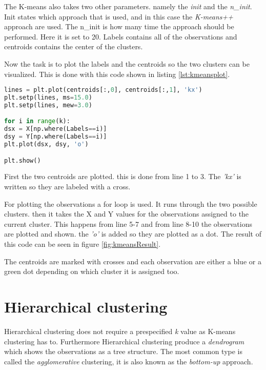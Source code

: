 The K-means also takes two other parameters. namely the \emph{init} and the \emph{n\_init}. Init states which approach that is used, and in this case the \emph{K-means++} approach are used. The n\_init is how many time the approach should be performed. Here it is set to 20.
Labels contains all of the observations and centroids contains the center of the clusters.

Now the task is to plot the labels and the centroids so the two clusters can be visualized. 
This is done with this code shown in listing \ref{lst:kmeansplot}.

\begin{lstlisting}[language=Python, label=lst:kmeansplot, caption=The code for plotting the two clusters]
lines = plt.plot(centroids[:,0], centroids[:,1], 'kx')
plt.setp(lines, ms=15.0)
plt.setp(lines, mew=3.0)

for i in range(k):
dsx = X[np.where(Labels==i)]
dsy = Y[np.where(Labels==i)]
plt.plot(dsx, dsy, 'o')

plt.show()
\end{lstlisting}

First the two centroids are plotted. this is done from line 1 to 3. The \emph{'kx'} is written so they are labeled with a cross.

For plotting the observations a for loop is used. It runs through the two possible clusters. then it takes the X and Y values for the observations assigned to the current cluster. This happens from line 5-7 and from line 8-10 the observations are plotted and shown. the \emph{'o'} is added so they are plotted as a dot. 
The result of this code can be seen in figure \ref{fig:kmeansResult}.


The centroids are marked with crosses and each observation are either a blue or a green dot depending on which cluster it is assigned too.


\section{Hierarchical clustering}
Hierarchical clustering does not require a prespecified \emph{k} value as K-means clustering has to.
Furthermore Hierarchical clustering produce a \emph{dendrogram} which shows the observations as a tree structure.
The most common type is called the \emph{agglomerative} clustering, it is also known as the \emph{bottom-up} approach.

